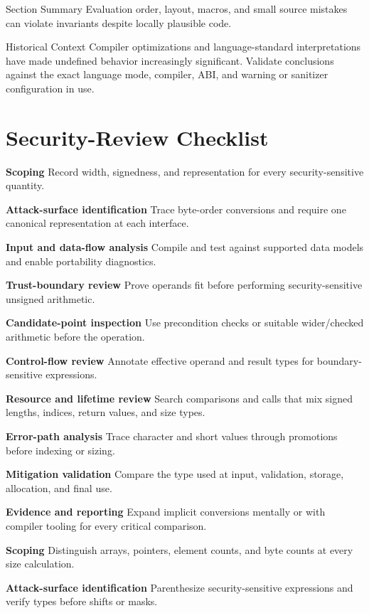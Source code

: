 \documentclass[11pt,letterpaper]{article}
\begin{document}
\begin{CornellSummaryBox}{Section Summary}
Evaluation order, layout, macros, and small source mistakes can violate invariants despite locally plausible code.
\end{CornellSummaryBox}
\begin{CornellLegacyBox}{Historical Context}
Compiler optimizations and language-standard interpretations have made undefined behavior increasingly significant. Validate conclusions against the exact language mode, compiler, ABI, and warning or sanitizer configuration in use.
\end{CornellLegacyBox}
\section{Security-Review Checklist}
\begin{CornellChecklist}
\item \textbf{Scoping}
Record width, signedness, and representation for every security-sensitive quantity.
\item \textbf{Attack-surface identification}
Trace byte-order conversions and require one canonical representation at each interface.
\item \textbf{Input and data-flow analysis}
Compile and test against supported data models and enable portability diagnostics.
\item \textbf{Trust-boundary review}
Prove operands fit before performing security-sensitive unsigned arithmetic.
\item \textbf{Candidate-point inspection}
Use precondition checks or suitable wider/checked arithmetic before the operation.
\item \textbf{Control-flow review}
Annotate effective operand and result types for boundary-sensitive expressions.
\item \textbf{Resource and lifetime review}
Search comparisons and calls that mix signed lengths, indices, return values, and size types.
\item \textbf{Error-path analysis}
Trace character and short values through promotions before indexing or sizing.
\item \textbf{Mitigation validation}
Compare the type used at input, validation, storage, allocation, and final use.
\item \textbf{Evidence and reporting}
Expand implicit conversions mentally or with compiler tooling for every critical comparison.
\item \textbf{Scoping}
Distinguish arrays, pointers, element counts, and byte counts at every size calculation.
\item \textbf{Attack-surface identification}
Parenthesize security-sensitive expressions and verify types before shifts or masks.
\end{CornellChecklist}
\end{document}
